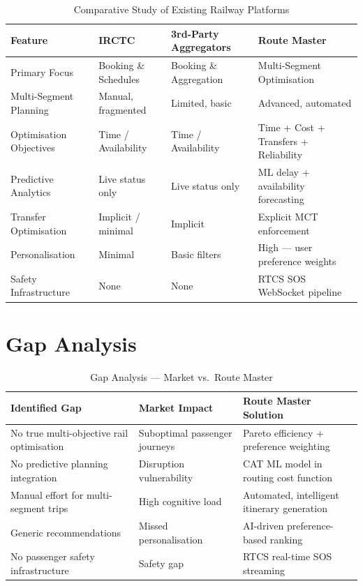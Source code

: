 \documentclass[12pt,a4paper]{report}
\begin{document}
\begin{table}[h!]
\centering
\caption{Comparative Study of Existing Railway Platforms}
\small
\begin{tabularx}{\textwidth}{lXXX}
\toprule
\textbf{Feature} & \textbf{IRCTC} & \textbf{3rd-Party Aggregators} & \textbf{Route Master} \\
\midrule
Primary Focus & Booking \& Schedules & Booking \& Aggregation & Multi-Segment Optimisation \\
Multi-Segment Planning & Manual, fragmented & Limited, basic & Advanced, automated \\
Optimisation Objectives & Time / Availability & Time / Availability & Time + Cost + Transfers + Reliability \\
Predictive Analytics & Live status only & Live status only & ML delay + availability forecasting \\
Transfer Optimisation & Implicit / minimal & Implicit & Explicit MCT enforcement \\
Personalisation & Minimal & Basic filters & High --- user preference weights \\
Safety Infrastructure & None & None & RTCS SOS WebSocket pipeline \\
\bottomrule
\end{tabularx}
\end{table}

\section{Gap Analysis}

\begin{table}[h!]
\centering
\caption{Gap Analysis --- Market vs.\ Route Master}
\small
\begin{tabularx}{\textwidth}{lXX}
\toprule
\textbf{Identified Gap} & \textbf{Market Impact} & \textbf{Route Master Solution} \\
\midrule
No true multi-objective rail optimisation & Suboptimal passenger journeys & Pareto efficiency + preference weighting \\
No predictive planning integration & Disruption vulnerability & CAT ML model in routing cost function \\
Manual effort for multi-segment trips & High cognitive load & Automated, intelligent itinerary generation \\
Generic recommendations & Missed personalisation & AI-driven preference-based ranking \\
No passenger safety infrastructure & Safety gap & RTCS real-time SOS streaming \\
\bottomrule
\end{tabularx}
\end{table}
\end{document}
